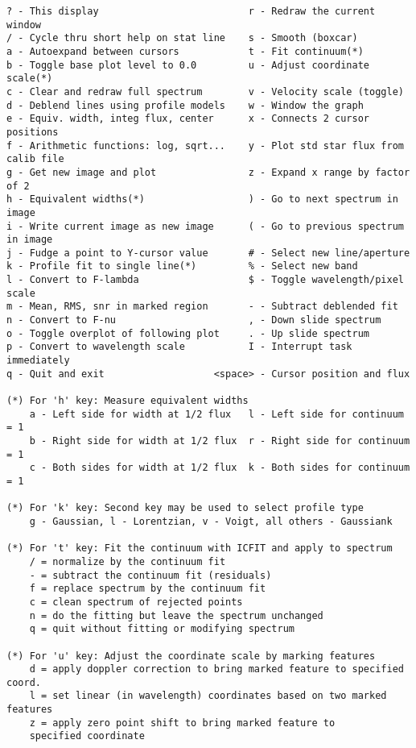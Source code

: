 \begingroup \fontsize{10pt}{10pt}
\selectfont
\begin{verbatim} 
? - This display                          r - Redraw the current window
/ - Cycle thru short help on stat line    s - Smooth (boxcar)
a - Autoexpand between cursors            t - Fit continuum(*)
b - Toggle base plot level to 0.0         u - Adjust coordinate scale(*)
c - Clear and redraw full spectrum        v - Velocity scale (toggle)
d - Deblend lines using profile models    w - Window the graph
e - Equiv. width, integ flux, center      x - Connects 2 cursor positions
f - Arithmetic functions: log, sqrt...    y - Plot std star flux from calib file
g - Get new image and plot                z - Expand x range by factor of 2
h - Equivalent widths(*)                  ) - Go to next spectrum in image
i - Write current image as new image      ( - Go to previous spectrum in image
j - Fudge a point to Y-cursor value       # - Select new line/aperture
k - Profile fit to single line(*)         % - Select new band
l - Convert to F-lambda                   $ - Toggle wavelength/pixel scale
m - Mean, RMS, snr in marked region       - - Subtract deblended fit
n - Convert to F-nu                       , - Down slide spectrum
o - Toggle overplot of following plot     . - Up slide spectrum
p - Convert to wavelength scale           I - Interrupt task immediately
q - Quit and exit                   <space> - Cursor position and flux

(*) For 'h' key: Measure equivalent widths
    a - Left side for width at 1/2 flux   l - Left side for continuum = 1
    b - Right side for width at 1/2 flux  r - Right side for continuum = 1
    c - Both sides for width at 1/2 flux  k - Both sides for continuum = 1

(*) For 'k' key: Second key may be used to select profile type
    g - Gaussian, l - Lorentzian, v - Voigt, all others - Gaussiank

(*) For 't' key: Fit the continuum with ICFIT and apply to spectrum
    / = normalize by the continuum fit
    - = subtract the continuum fit (residuals)
    f = replace spectrum by the continuum fit
    c = clean spectrum of rejected points
    n = do the fitting but leave the spectrum unchanged
    q = quit without fitting or modifying spectrum

(*) For 'u' key: Adjust the coordinate scale by marking features
    d = apply doppler correction to bring marked feature to specified coord.
    l = set linear (in wavelength) coordinates based on two marked features
    z = apply zero point shift to bring marked feature to
	specified coordinate


\end{verbatim}

